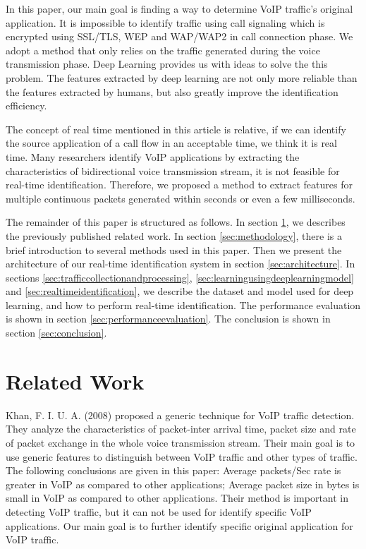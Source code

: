 \documentclass[conference]{IEEEtran}
\begin{document}
In this paper, our main goal is finding a way to determine VoIP traffic's original application. It is impossible to identify traffic using call signaling which is encrypted using SSL/TLS, WEP and WAP/WAP2 in call connection phase. We adopt a method that only relies on the traffic generated during the voice transmission phase. Deep Learning provides us with ideas to solve the this problem.
The features extracted by deep learning are not only more reliable than the features extracted by humans, but also greatly improve the identification efficiency.

The concept of real time mentioned in this article is relative, if we can identify the source application of a call flow in an acceptable time, we think it is real time. Many researchers identify VoIP applications by extracting the characteristics of bidirectional voice transmission stream, it is not feasible for real-time identification. Therefore, we proposed a method to extract features for multiple continuous packets generated within seconds or even a few milliseconds.

The remainder of this paper is structured as follows. In section \ref{sec:relatedwork}, we describes the previously published related work.  In section \ref{sec:methodology}, there is a brief introduction to several methods used in this paper. Then we present the architecture of our real-time identification system in section \ref{sec:architecture}. In sections \ref{sec:trafficcollectionandprocessing}, \ref{sec:learningusingdeeplearningmodel} and \ref{sec:realtimeidentification}, we describe the dataset and model used for deep learning, and how to perform real-time identification. The performance evaluation is shown in section \ref{sec:performanceevaluation}. The conclusion is shown in section \ref{sec:conclusion}.

\section{Related Work}
\label{sec:relatedwork}
Khan, F. I. U. A. (2008) \cite{2} proposed a generic technique for VoIP traffic detection. They analyze the characteristics of packet-inter arrival time, packet size and rate of packet exchange in the whole voice transmission stream. Their main goal is to use generic features to distinguish between VoIP traffic and other types of traffic. The following conclusions are given in this paper: Average packets/Sec rate is greater in VoIP as compared to other applications; Average packet size in bytes is small in VoIP as compared to other applications. Their method is important in detecting VoIP traffic, but it can not be used for identify specific VoIP applications. Our main goal is to further identify specific original application for VoIP traffic.
\end{document}

